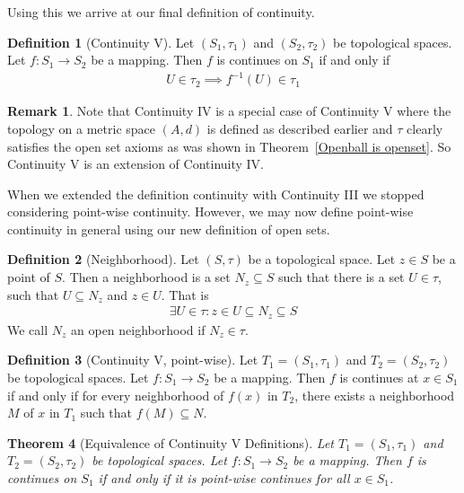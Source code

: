 \documentclass{article}
\theoremstyle{plain}
\newtheorem{theorem}{Theorem}
\theoremstyle{definition}
\newtheorem*{remark}{Remark}
\newtheorem{definition}[theorem]{Definition}
\begin{document}
Using this we arrive at our final definition of continuity.
\begin{definition}[Continuity V]
	Let $(S_1,\tau_1)$ and $(S_2,\tau_2)$ be topological spaces. Let
	$f:S_1\rightarrow S_2$ be a mapping. Then $f$ is continues on $S_1$ if and
	only if
	\begin{equation}
	\begin{aligned}
		U\in\tau_2 \implies f^{-1}(U)\in\tau_1
	\end{aligned}
	\end{equation}
\end{definition}
\begin{remark}
	Note that Continuity IV is a special case of Continuity V where
	the topology on a metric space $(A,d)$ is defined as described
	earlier and $\tau$ clearly satisfies the open set axioms as was
	shown in Theorem~\ref{Openball is openset}. So Continuity V is
	an extension of Continuity IV.
\end{remark}
When we extended the definition continuity with Continuity III we stopped
considering point-wise continuity. However, we may now define point-wise
continuity in general using our new definition of open sets.
\begin{definition}[Neighborhood]
	Let $(S,\tau)$ be a topological space. Let $z\in S$ be a point of $S$. Then
	a neighborhood is a set $N_z\subseteq S$ such that there is a set $U\in
	\tau$, such that $U\subseteq N_z$ and $z\in U$. That is
	\begin{equation}
	\begin{aligned}
		\exists U\in\tau: z\in U\subseteq N_z \subseteq S
	\end{aligned}
	\end{equation}
	We call $N_z$ an open neighborhood if $N_z\in\tau$.
\end{definition}
\begin{definition}[Continuity V, point-wise]
	Let $T_1=(S_1,\tau_1)$ and $T_2=(S_2,\tau_2)$ be topological spaces. Let
	$f:S_1\rightarrow S_2$ be a mapping. Then $f$ is continues at $x\in S_1$ 
	if and only if for every neighborhood of $f(x)$ in $T_2$, there exists a
	neighborhood $M$ of $x$ in $T_1$ such that $f(M)\subseteq N$.
\end{definition}
\begin{theorem}[Equivalence of Continuity V Definitions]
	Let $T_1=(S_1,\tau_1)$ and $T_2=(S_2,\tau_2)$ be topological spaces. Let
	$f:S_1\rightarrow S_2$ be a mapping. Then $f$ is continues on $S_1$ if and
	only if it is point-wise continues for all $x\in S_1$.
\end{theorem}
\end{document}
